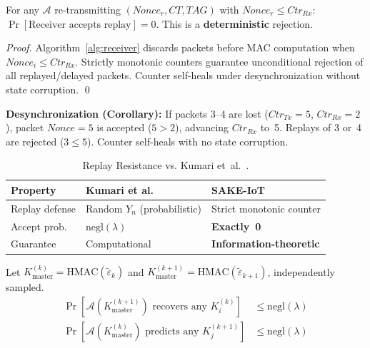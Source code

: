 \documentclass[runningheads]{llncs}
\newcommand{\Kmaster}{K_{\mathrm{master}}}
\begin{document}
\begin{theorem}
\label{thm:replay}
For any $\mathcal{A}$ re-transmitting $(\mathit{Nonce}_r, CT, TAG)$ with
$\mathit{Nonce}_r \leq \mathit{Ctr}_{Rx}$:
$\Pr[\text{Receiver accepts replay}] = 0$.
This is a \textbf{deterministic} rejection.
\end{theorem}

\begin{proof}
Algorithm~\ref{alg:receiver} discards packets before MAC computation when
$\mathit{Nonce}_i \leq \mathit{Ctr}_{Rx}$. Strictly monotonic counters guarantee
unconditional rejection of all replayed/delayed packets. Counter self-heals under
desynchronization without state corruption. \qed
\end{proof}

\noindent\textbf{Desynchronization (Corollary):} If packets 3--4 are lost
($\mathit{Ctr}_{Tx}=5$, $\mathit{Ctr}_{Rx}=2$), packet $\mathit{Nonce}=5$
is accepted ($5 > 2$), advancing $\mathit{Ctr}_{Rx}$ to~5. Replays of 3 or~4
are rejected ($3 \leq 5$). Counter self-heals with no state corruption.

\begin{table}[t]
\caption{Replay Resistance vs. Kumari et~al.~\cite{kumari2022}.}
\label{tab:replaycompare}
\centering
\begin{tabular}{|p{2.5cm}|p{3.5cm}|p{3.5cm}|}
\hline
\textbf{Property} & \textbf{Kumari et al.} & \textbf{SAKE-IoT} \\
\hline
Replay defense & Random $Y_n$ (probabilistic) & Strict monotonic counter \\
Accept prob. & $\mathrm{negl}(\lambda)$ & \textbf{Exactly~0} \\
Guarantee & Computational & \textbf{Information-theoretic} \\
\hline
\end{tabular}
\end{table}

\begin{theorem}
\label{thm:ebfs}
Let $\Kmaster^{(k)} = \mathrm{HMAC}(\tilde{\varepsilon}_k)$ and $\Kmaster^{(k+1)}
= \mathrm{HMAC}(\tilde{\varepsilon}_{k+1})$, independently sampled.
\begin{align}
\Pr[\mathcal{A}(\Kmaster^{(k+1)}) \text{ recovers any } K_i^{(k)}] &\leq \mathrm{negl}(\lambda) \\
\Pr[\mathcal{A}(\Kmaster^{(k)}) \text{ predicts any } K_j^{(k+1)}] &\leq \mathrm{negl}(\lambda)
\end{align}
\end{theorem}
\end{document}
